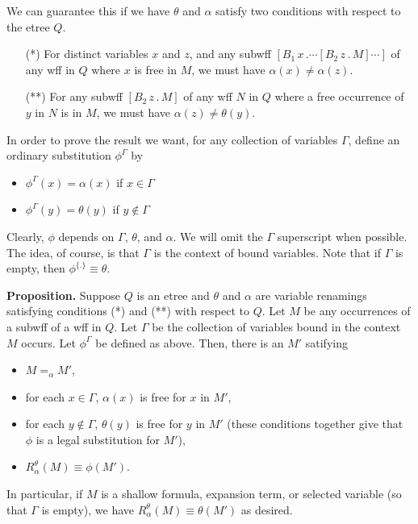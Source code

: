 We can guarantee this if we have $\theta$ and $\alpha$ satisfy two conditions with respect to the etree $Q$.
\begin{itemize}
\item [(*)]  For distinct variables $x$ and $z$, and
any subwff $[B_1 \, x \, . \cdots [B_2\, z \, . \, M] \cdots]$ of any wff in $Q$
where $x$ is free in $M$, we must have $\alpha(x)\neq\alpha(z)$.
\item [(**)] For any subwff $[B_2\, z \, . \, M]$ of any wff $N$ in $Q$
where a free occurrence of $y$ in $N$ is in $M$, we must have $\alpha(z)\neq\theta(y)$.
\end{itemize}
In order to prove the result we want, for any collection of variables $\Gamma$,
define an ordinary substitution $\phi^\Gamma$ by
\begin{itemize}
\item $\phi^\Gamma(x) = \alpha(x)$ if $x\in \Gamma$
\item $\phi^\Gamma(y) = \theta(y)$ if $y\not\in \Gamma$
\end{itemize}
Clearly, $\phi$ depends on $\Gamma$, $\theta$, and $\alpha$.
We will omit the $\Gamma$ superscript when possible.
The idea, of course, is that $\Gamma$ is the context of bound variables.
Note that if $\Gamma$ is empty, then $\phi^{\{.\}} \equiv \theta$.

{\bf Proposition.}  Suppose $Q$ is an etree and $\theta$ and $\alpha$ are variable renamings
satisfying conditions (*) and (**) with respect to $Q$.
Let $M$ be any occurrences of a subwff of a wff in $Q$.  Let $\Gamma$ be the collection of variables 
bound in the context $M$ occurs.  Let $\phi^\Gamma$ be defined as above.
Then, there is an $M'$ satifying
\begin{itemize}
\item $M =_\alpha M'$,
\item for each $x\in\Gamma$, $\alpha(x)$ is free for $x$ in $M'$,
\item for each $y\not\in\Gamma$, $\theta(y)$ is free for $y$ in $M'$
(these conditions together give that $\phi$ is a legal substitution for $M'$),
\item $R^\theta_\alpha(M) \equiv \phi(M')$.
\end{itemize}
In particular, if $M$ is a shallow formula, expansion term, or selected variable
(so that $\Gamma$ is empty), we have $R^\theta_\alpha(M) \equiv \theta(M')$ as desired.

